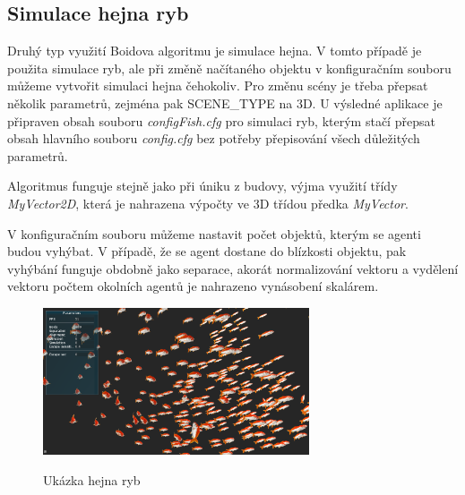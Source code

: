 \documentclass[czech,public,dept460,male,cpdeclaration]{diploma}
\begin{document}


\newpage

\subsection{Simulace hejna ryb}
Druhý typ využití Boidova algoritmu je simulace hejna. V tomto případě je použita simulace ryb, ale při změně načítaného objektu v konfiguračním souboru můžeme vytvořit simulaci hejna čehokoliv. Pro změnu scény je třeba přepsat několik parametrů, zejména pak SCENE\_TYPE na 3D. U výsledné aplikace je připraven obsah souboru \textit{configFish.cfg} pro simulaci ryb, kterým stačí přepsat obsah hlavního souboru \textit{config.cfg} bez potřeby přepisování všech důležitých parametrů.

Algoritmus funguje stejně jako při úniku z budovy, výjma využití třídy \textit{MyVector2D}, která je nahrazena výpočty ve 3D třídou předka \textit{MyVector}.

V konfiguračním souboru můžeme nastavit počet objektů, kterým se agenti budou vyhýbat. V případě, že se agent dostane do blízkosti objektu, pak vyhýbání funguje obdobně jako separace, akorát normalizování vektoru a vydělení vektoru počtem okolních agentů je nahrazeno vynásobení skalárem.

\begin{figure}[H]\centering\includegraphics[width=0.7\textwidth]{Figures/fish4.jpg}\label{fig:fishExample}
	\caption{Ukázka hejna ryb}
	\label{fig:fishExample}
\end{figure}
\end{document}
